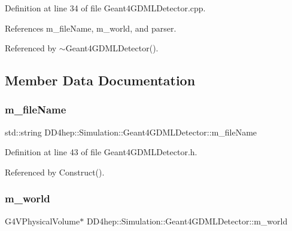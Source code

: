 Definition at line 34 of file Geant4\+G\+D\+M\+L\+Detector.\+cpp.



References m\+\_\+file\+Name, m\+\_\+world, and parser.



Referenced by $\sim$\+Geant4\+G\+D\+M\+L\+Detector().



\subsection{Member Data Documentation}
\hypertarget{class_d_d4hep_1_1_simulation_1_1_geant4_g_d_m_l_detector_a48ddc632f08c696ac90deb8c27eaf43a}{}\label{class_d_d4hep_1_1_simulation_1_1_geant4_g_d_m_l_detector_a48ddc632f08c696ac90deb8c27eaf43a} 
\subsubsection{\texorpdfstring{m\+\_\+file\+Name}{m\_fileName}}
{\footnotesize\ttfamily std\+::string D\+D4hep\+::\+Simulation\+::\+Geant4\+G\+D\+M\+L\+Detector\+::m\+\_\+file\+Name\hspace{0.3cm}{\ttfamily [private]}}



Definition at line 43 of file Geant4\+G\+D\+M\+L\+Detector.\+h.



Referenced by Construct().

\hypertarget{class_d_d4hep_1_1_simulation_1_1_geant4_g_d_m_l_detector_a26c0472c7321ec265414a1329ba5fdf3}{}\label{class_d_d4hep_1_1_simulation_1_1_geant4_g_d_m_l_detector_a26c0472c7321ec265414a1329ba5fdf3} 
\subsubsection{\texorpdfstring{m\+\_\+world}{m\_world}}
{\footnotesize\ttfamily G4\+V\+Physical\+Volume$\ast$ D\+D4hep\+::\+Simulation\+::\+Geant4\+G\+D\+M\+L\+Detector\+::m\+\_\+world\hspace{0.3cm}{\ttfamily [private]}}



